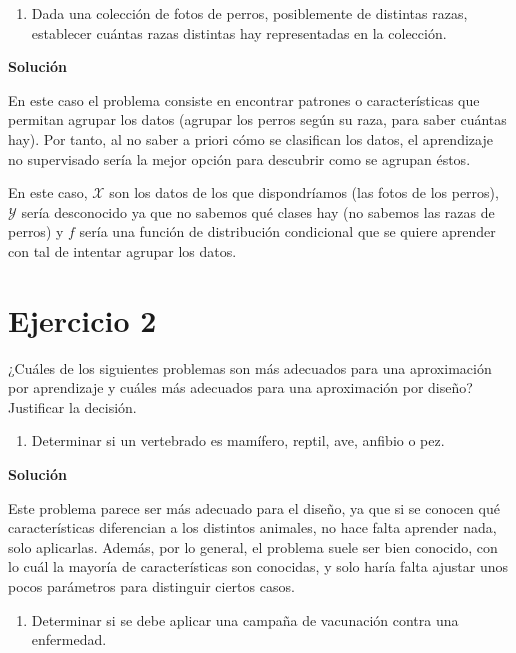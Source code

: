 \documentclass[11pt,a4paper]{article}
\newcommand{\answer}{\noindent\textbf{Solución}}
\begin{document}
\begin{enumerate}[resume,label=\textit{\alph*})]
	\item Dada una colección de fotos de perros, posiblemente de distintas razas, establecer
	cuántas razas distintas hay representadas en la colección.
\end{enumerate}

\answer

En este caso el problema consiste en encontrar patrones o características que permitan agrupar los datos (agrupar los perros
según su raza, para saber cuántas hay). Por tanto, al no saber a priori cómo se clasifican los datos, el aprendizaje no
supervisado sería la mejor opción para descubrir como se agrupan éstos.

En este caso, $\mathcal{X}$ son los datos de los que dispondríamos (las fotos de los perros), $\mathcal{Y}$ sería desconocido
ya que no sabemos qué clases hay (no sabemos las razas de perros) y $f$ sería una función de distribución condicional que se
quiere aprender con tal de intentar agrupar los datos.

\section*{Ejercicio 2}

\noindent ¿Cuáles de los siguientes problemas son más adecuados para una aproximación por aprendizaje y cuáles más adecuados
para una aproximación por diseño? Justificar la decisión.

\begin{enumerate}[label=\textit{\alph*})]
	\item Determinar si un vertebrado es mamífero, reptil, ave, anfibio o pez.
\end{enumerate}

\answer

Este problema parece ser más adecuado para el diseño, ya que si se conocen qué características diferencian a los distintos
animales, no hace falta aprender nada, solo aplicarlas. Además, por lo general, el problema suele ser bien conocido, con lo
cuál la mayoría de características son conocidas, y solo haría falta ajustar unos pocos parámetros para distinguir ciertos
casos.

\begin{enumerate}[resume,label=\textit{\alph*})]
	\item Determinar si se debe aplicar una campaña de vacunación contra una enfermedad.
\end{enumerate}
\end{document}
